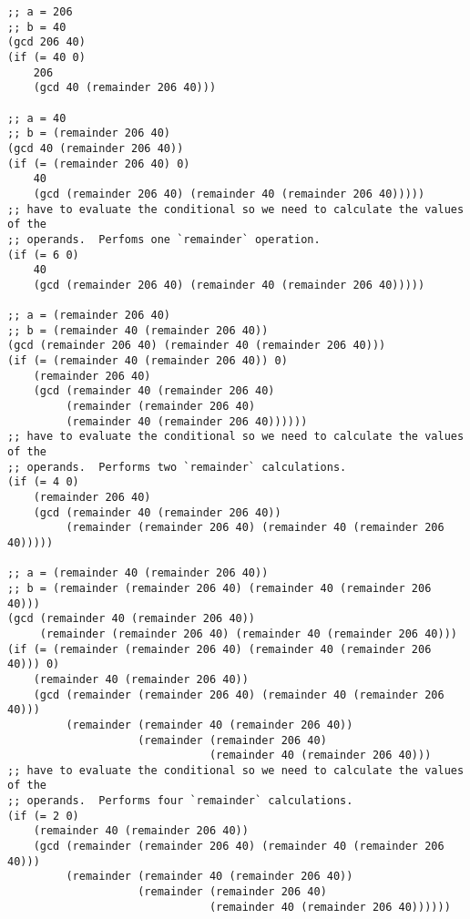 \documentclass{article}
\begin{document}
\vspace{3mm}
\begin{lstlisting}[style=scheme]
;; a = 206
;; b = 40
(gcd 206 40)
(if (= 40 0)
    206
    (gcd 40 (remainder 206 40)))

;; a = 40
;; b = (remainder 206 40)
(gcd 40 (remainder 206 40))
(if (= (remainder 206 40) 0)
    40
    (gcd (remainder 206 40) (remainder 40 (remainder 206 40)))))
;; have to evaluate the conditional so we need to calculate the values of the
;; operands.  Perfoms one `remainder` operation.
(if (= 6 0)
    40
    (gcd (remainder 206 40) (remainder 40 (remainder 206 40)))))

;; a = (remainder 206 40)
;; b = (remainder 40 (remainder 206 40))
(gcd (remainder 206 40) (remainder 40 (remainder 206 40)))
(if (= (remainder 40 (remainder 206 40)) 0)
    (remainder 206 40)
    (gcd (remainder 40 (remainder 206 40)
         (remainder (remainder 206 40)
         (remainder 40 (remainder 206 40))))))
;; have to evaluate the conditional so we need to calculate the values of the
;; operands.  Performs two `remainder` calculations.
(if (= 4 0)
    (remainder 206 40)
    (gcd (remainder 40 (remainder 206 40))
         (remainder (remainder 206 40) (remainder 40 (remainder 206 40)))))

;; a = (remainder 40 (remainder 206 40))
;; b = (remainder (remainder 206 40) (remainder 40 (remainder 206 40)))
(gcd (remainder 40 (remainder 206 40))
     (remainder (remainder 206 40) (remainder 40 (remainder 206 40)))
(if (= (remainder (remainder 206 40) (remainder 40 (remainder 206 40))) 0)
    (remainder 40 (remainder 206 40))
    (gcd (remainder (remainder 206 40) (remainder 40 (remainder 206 40)))
         (remainder (remainder 40 (remainder 206 40))
                    (remainder (remainder 206 40)
                               (remainder 40 (remainder 206 40)))
;; have to evaluate the conditional so we need to calculate the values of the
;; operands.  Performs four `remainder` calculations.
(if (= 2 0)
    (remainder 40 (remainder 206 40))
    (gcd (remainder (remainder 206 40) (remainder 40 (remainder 206 40)))
         (remainder (remainder 40 (remainder 206 40))
                    (remainder (remainder 206 40)
                               (remainder 40 (remainder 206 40))))))


\end{lstlisting}
\end{document}
